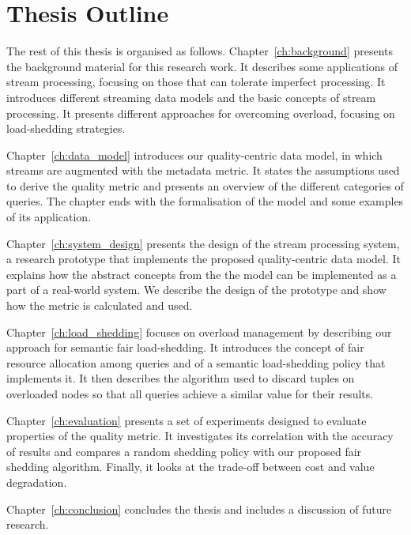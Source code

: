 \section{Thesis Outline}

The rest of this thesis is organised as follows. Chapter~\ref{ch:background} presents the background
material for this research work. It describes some applications of stream processing, focusing on
those that can tolerate imperfect processing. It introduces different streaming data models and the
basic concepts of stream processing. It presents different approaches for overcoming overload, focusing
on \mbox{load-shedding} strategies.

Chapter~\ref{ch:data_model} introduces our quality-centric data model, in which streams are augmented
with the \sic metadata metric. It states the assumptions used to derive the quality metric and presents
an overview of the different categories of queries. The chapter ends with the formalisation of the model
and some examples of its application.

Chapter~\ref{ch:system_design} presents the design of the \sys stream processing system, a research
prototype that implements the proposed quality-centric data model. It explains how the abstract concepts
from the the model can be implemented as a part of a real-world system. We describe the design of the
prototype and show how the \sic metric is calculated and used.

Chapter~\ref{ch:load_shedding} focuses on overload management by describing our approach for semantic
fair \mbox{load-shedding}. It introduces the concept of fair resource allocation among
queries and of a semantic load-shedding policy that implements it. It then describes the algorithm used
to discard tuples on overloaded nodes so that all queries achieve a similar \sic value for their results.

Chapter~\ref{ch:evaluation} presents a set of experiments designed to evaluate properties of the
\sic quality metric. It investigates its correlation with the accuracy of results and compares a random
shedding policy with our proposed fair shedding algorithm. Finally, it looks at the trade-off between
cost and \sic value degradation.

Chapter~\ref{ch:conclusion} concludes the thesis and includes a discussion of future research.